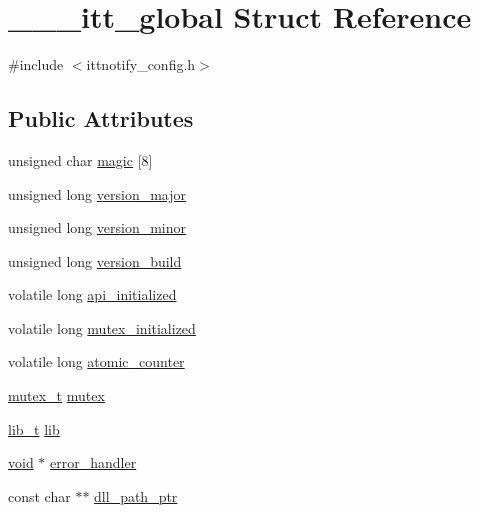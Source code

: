 \hypertarget{struct______itt__global}{\section{\-\_\-\-\_\-\-\_\-itt\-\_\-global Struct Reference}
\label{struct______itt__global}
}


{\ttfamily \#include $<$ittnotify\-\_\-config.\-h$>$}

\subsection*{Public Attributes}
\begin{DoxyCompactItemize}
\item 
unsigned char \hyperlink{struct______itt__global_ab0e52e46d4af19f31c990bedcd6948df}{magic} \mbox{[}8\mbox{]}
\item 
unsigned long \hyperlink{struct______itt__global_aaad26e96e84268d03a08cb840a2113c3}{version\-\_\-major}
\item 
unsigned long \hyperlink{struct______itt__global_a4487d06049ec27f22ad144eb2f57e0b5}{version\-\_\-minor}
\item 
unsigned long \hyperlink{struct______itt__global_a4ad1debe7bab64e55300de356e7f73a9}{version\-\_\-build}
\item 
volatile long \hyperlink{struct______itt__global_adb68468b1a0fa798009ea4e128ae98f0}{api\-\_\-initialized}
\item 
volatile long \hyperlink{struct______itt__global_a6c90634b5939d5718f63161edf0ee002}{mutex\-\_\-initialized}
\item 
volatile long \hyperlink{struct______itt__global_a43a21d694a84edc516d1d4cc07d65313}{atomic\-\_\-counter}
\item 
\hyperlink{ittnotify__config_8h_acd7d16dd262643b525d56ff94c176a11}{mutex\-\_\-t} \hyperlink{struct______itt__global_ad09e87e07b15a780422e4ae565e06c5e}{mutex}
\item 
\hyperlink{ittnotify__config_8h_a448e158e64bb4009efbe4e949cb16b86}{lib\-\_\-t} \hyperlink{struct______itt__global_acd607182b03ee49400b6a4ffa69ae5db}{lib}
\item 
\hyperlink{ittnotify__static_8h_af941d56e55e3c5465135b60c4d6343ed}{void} $\ast$ \hyperlink{struct______itt__global_a5218b05dd00a757cd30e4a324d5a0305}{error\-\_\-handler}
\item 
const char $\ast$$\ast$ \hyperlink{struct______itt__global_a809581305da5391f26bd268673155ec7}{dll\-\_\-path\-\_\-ptr}
$$
\end{DoxyCompactItemize}
